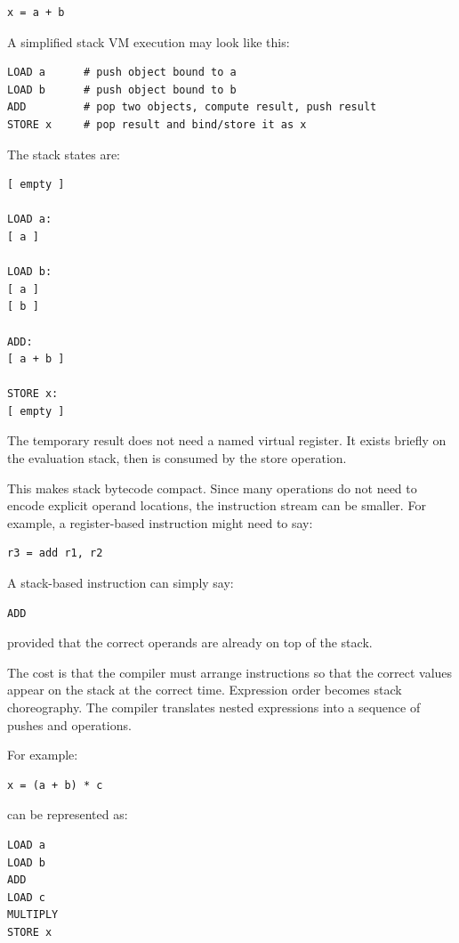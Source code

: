 \documentclass[a4paper,twoside]{report}
\begin{document}
\begin{verbatim}
x = a + b
\end{verbatim}

A simplified stack VM execution may look like this:

\begin{verbatim}
LOAD a      # push object bound to a
LOAD b      # push object bound to b
ADD         # pop two objects, compute result, push result
STORE x     # pop result and bind/store it as x
\end{verbatim}

The stack states are:

\begin{verbatim}
[ empty ]

LOAD a:
[ a ]

LOAD b:
[ a ]
[ b ]

ADD:
[ a + b ]

STORE x:
[ empty ]
\end{verbatim}

The temporary result does not need a named virtual register. It exists briefly on the evaluation stack, then is consumed by the store operation.

This makes stack bytecode compact. Since many operations do not need to encode explicit operand locations, the instruction stream can be smaller. For example, a register-based instruction might need to say:

\begin{verbatim}
r3 = add r1, r2
\end{verbatim}

A stack-based instruction can simply say:

\begin{verbatim}
ADD
\end{verbatim}

provided that the correct operands are already on top of the stack.

The cost is that the compiler must arrange instructions so that the correct values appear on the stack at the correct time. Expression order becomes stack choreography. The compiler translates nested expressions into a sequence of pushes and operations.

For example:

\begin{verbatim}
x = (a + b) * c
\end{verbatim}

can be represented as:

\begin{verbatim}
LOAD a
LOAD b
ADD
LOAD c
MULTIPLY
STORE x
\end{verbatim}
\end{document}
